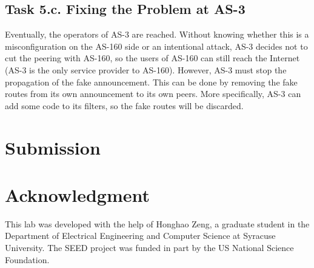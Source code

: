 \subsection{Task 5.c. Fixing the Problem at AS-3} 

Eventually, the operators of AS-3 are reached. Without knowing 
whether this is a misconfiguration on the AS-160 side or an intentional
attack, AS-3 decides not to cut the peering with AS-160, so the users 
of AS-160 can still reach the Internet (AS-3 is the only service 
provider to AS-160). However, AS-3 must stop the propagation of the 
fake announcement. This can be done by removing the 
fake routes from its own announcement to its own peers.
More specifically, AS-3 can add some code to its 
filters, so the fake routes will be discarded. 


\section{Submission}





\section*{Acknowledgment} 

This lab was developed with the help of Honghao Zeng, 
a graduate student in the Department of Electrical Engineering 
and Computer Science at Syracuse University. 
The SEED project was funded in part 
by the US National Science Foundation. 







